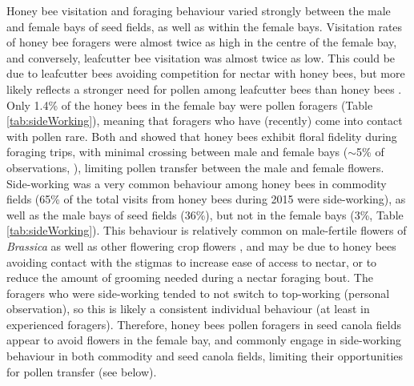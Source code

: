 \documentclass[12pt, draft]{article} %
\begin{document}
Honey bee visitation and foraging behaviour varied strongly between the male and female bays of seed fields, as well as within the female bays.
Visitation rates of honey bee foragers were almost twice as high in the centre of the female bay, and conversely, leafcutter bee visitation was almost twice as low.
This could be due to leafcutter bees avoiding competition for nectar with honey bees, but more likely reflects a stronger need for pollen among leafcutter bees than honey bees \citep{cane2011}.
Only 1.4\% of the honey bees in the female bay were pollen foragers (Table \ref{tab:sideWorking}), meaning that foragers who have (recently) come into contact with pollen rare.
Both \citet{waytesMsc} and \citet{gaffney2019} showed that honey bees exhibit floral fidelity during foraging trips, with minimal crossing between male and female bays ($\sim$5\% of observations, \citealp{waytesMsc}), limiting pollen transfer between the male and female flowers.
Side-working was a very common behaviour among honey bees in commodity fields (65\% of the total visits from honey bees during 2015 were side-working), as well as the male bays of seed fields (36\%), but not in the female bays (3\%, Table \ref{tab:sideWorking}).
This behaviour is relatively common on male-fertile flowers of \textit{Brassica} \citep{free1973,free1983,delbrassine1988,mohr1988} as well as other flowering crop flowers \citep{thomson2001}, and may be due to honey bees avoiding contact with the stigmas to increase ease of access to nectar, or to reduce the amount of grooming needed during a nectar foraging bout.
The foragers who were side-working tended to not switch to top-working (personal observation), so this is likely a consistent individual behaviour (at least in experienced foragers).
Therefore, honey bees pollen foragers in seed canola fields appear to avoid flowers in the female bay, and commonly engage in side-working behaviour in both commodity and seed canola fields, limiting their opportunities for pollen transfer (see below).
\end{document}
